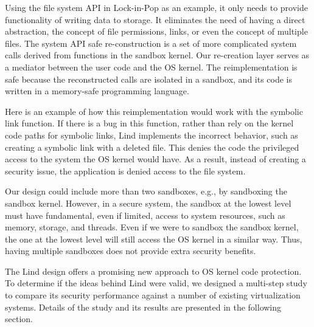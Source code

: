 Using the file system API in Lock-in-Pop as an example, it only needs
to provide functionality of writing data to storage.
It eliminates the need of having a direct abstraction, the
concept of file permissions, links, or even the concept of multiple files.
The system API safe re-construction is a set of more complicated system calls
derived from functions in the sandbox kernel.
Our re-creation layer serves as a mediator between the user code
and the OS kernel. The reimplementation is safe
because the reconstructed calls are isolated in a sandbox, and its code is written
 in a memory-safe programming language.

Here is an example of how this reimplementation would work with the symbolic link function.
If there is a bug in this function, rather than rely on the kernel code paths
for symbolic links, Lind implements the incorrect behavior, such as creating a symbolic link
with a deleted file.
This denies the code the privileged access to the system the OS kernel would have.
As a result, instead of creating a security issue, the application is denied access
to the file system.

Our design could include more than two sandboxes, e.g., by sandboxing the sandbox
kernel. However, in a secure system,
the sandbox at the lowest level must have fundamental,
even if limited, access to system resources, such as memory, storage, and threads.
Even if we were to sandbox the sandbox kernel,
the one at the lowest level will still access the OS kernel in a similar way.
Thus, having multiple sandboxes does not provide extra security benefits.

The Lind design offers a promising new approach to OS kernel code protection.
 To determine if the ideas behind Lind were valid, we
designed a multi-step study to compare its security performance against a number
 of existing virtualization systems. Details of the study and its results are presented
 in the following section.
